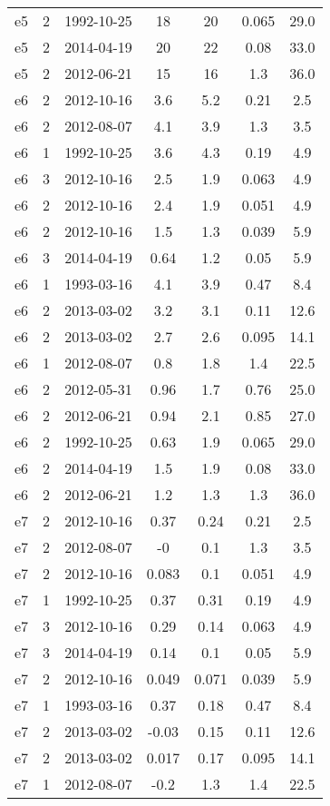 \begin{table*}[htp]
\begin{tabular}{ccccccc}
e5 & 2 & 1992-10-25 & 18 & 20 & 0.065 & 29.0 \\
e5 & 2 & 2014-04-19 & 20 & 22 & 0.08 & 33.0 \\
e5 & 2 & 2012-06-21 & 15 & 16 & 1.3 & 36.0 \\
e6 & 2 & 2012-10-16 & 3.6 & 5.2 & 0.21 & 2.5 \\
e6 & 2 & 2012-08-07 & 4.1 & 3.9 & 1.3 & 3.5 \\
e6 & 1 & 1992-10-25 & 3.6 & 4.3 & 0.19 & 4.9 \\
e6 & 3 & 2012-10-16 & 2.5 & 1.9 & 0.063 & 4.9 \\
e6 & 2 & 2012-10-16 & 2.4 & 1.9 & 0.051 & 4.9 \\
e6 & 2 & 2012-10-16 & 1.5 & 1.3 & 0.039 & 5.9 \\
e6 & 3 & 2014-04-19 & 0.64 & 1.2 & 0.05 & 5.9 \\
e6 & 1 & 1993-03-16 & 4.1 & 3.9 & 0.47 & 8.4 \\
e6 & 2 & 2013-03-02 & 3.2 & 3.1 & 0.11 & 12.6 \\
e6 & 2 & 2013-03-02 & 2.7 & 2.6 & 0.095 & 14.1 \\
e6 & 1 & 2012-08-07 & 0.8 & 1.8 & 1.4 & 22.5 \\
e6 & 2 & 2012-05-31 & 0.96 & 1.7 & 0.76 & 25.0 \\
e6 & 2 & 2012-06-21 & 0.94 & 2.1 & 0.85 & 27.0 \\
e6 & 2 & 1992-10-25 & 0.63 & 1.9 & 0.065 & 29.0 \\
e6 & 2 & 2014-04-19 & 1.5 & 1.9 & 0.08 & 33.0 \\
e6 & 2 & 2012-06-21 & 1.2 & 1.3 & 1.3 & 36.0 \\
e7 & 2 & 2012-10-16 & 0.37 & 0.24 & 0.21 & 2.5 \\
e7 & 2 & 2012-08-07 & -0 & 0.1 & 1.3 & 3.5 \\
e7 & 2 & 2012-10-16 & 0.083 & 0.1 & 0.051 & 4.9 \\
e7 & 1 & 1992-10-25 & 0.37 & 0.31 & 0.19 & 4.9 \\
e7 & 3 & 2012-10-16 & 0.29 & 0.14 & 0.063 & 4.9 \\
e7 & 3 & 2014-04-19 & 0.14 & 0.1 & 0.05 & 5.9 \\
e7 & 2 & 2012-10-16 & 0.049 & 0.071 & 0.039 & 5.9 \\
e7 & 1 & 1993-03-16 & 0.37 & 0.18 & 0.47 & 8.4 \\
e7 & 2 & 2013-03-02 & -0.03 & 0.15 & 0.11 & 12.6 \\
e7 & 2 & 2013-03-02 & 0.017 & 0.17 & 0.095 & 14.1 \\
e7 & 1 & 2012-08-07 & -0.2 & 1.3 & 1.4 & 22.5 \\

\end{tabular}
\end{table*}
